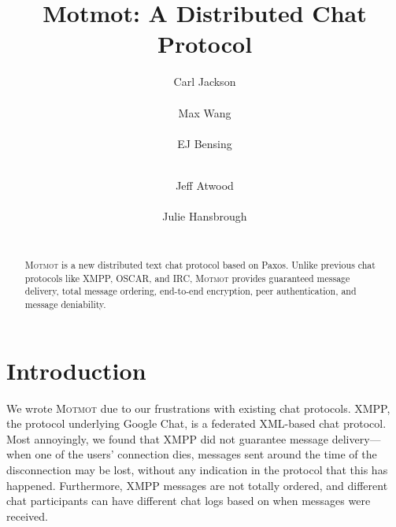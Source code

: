 \documentclass{sig-alternate}
\newcommand\Motmot{\textsc{Motmot}\xspace}
\begin{document}

\title{Motmot: A Distributed Chat Protocol}

%
\author{
  \alignauthor
  Carl Jackson \\
     \\
  \alignauthor
  Max Wang \\
     \\
  \alignauthor
  EJ Bensing \\
     \\
  \and
  \alignauthor
  Jeff Atwood \\
     \\
  \alignauthor
  Julie Hansbrough \\
     \\
}

\maketitle

\begin{abstract}

\Motmot is a new distributed text chat protocol based on Paxos. Unlike previous
chat protocols like XMPP, OSCAR, and IRC, \Motmot provides guaranteed message
delivery, total message ordering, end-to-end encryption, peer authentication,
and message deniability.

\end{abstract}

\section{Introduction}

We wrote \Motmot due to our frustrations with existing chat protocols. XMPP, the
protocol underlying Google Chat, is a federated XML-based chat protocol. Most
annoyingly, we found that XMPP did not guarantee message delivery---when one
of the users' connection dies, messages sent around the time of the
disconnection may be lost, without any indication in the protocol that this has
happened. Furthermore, XMPP messages are not totally ordered, and different chat
participants can have different chat logs based on when messages were received.
\end{document}

